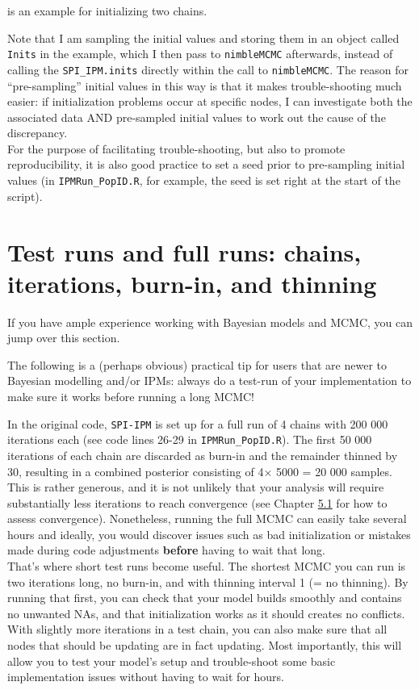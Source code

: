 \documentclass[
]{book}
\begin{document}
is an example for initializing two chains.

Note that I am sampling the initial values and storing them in an object called
\texttt{Inits} in the example, which I then pass to \texttt{nimbleMCMC} afterwards, instead of
calling the \texttt{SPI\_IPM.inits} directly within the call to \texttt{nimbleMCMC}. The reason
for ``pre-sampling'' initial values in this way is that it makes trouble-shooting
much easier: if initialization problems occur at specific nodes, I can
investigate both the associated data AND pre-sampled initial values to work out
the cause of the discrepancy.\\
For the purpose of facilitating trouble-shooting, but also to promote reproducibility,
it is also good practice to set a seed prior to pre-sampling initial values
(in \texttt{IPMRun\_PopID.R}, for example, the seed is set right at the start of the
script).

\hypertarget{test-runs-and-full-runs-chains-iterations-burn-in-and-thinning}{%
\section{Test runs and full runs: chains, iterations, burn-in, and thinning}\label{test-runs-and-full-runs-chains-iterations-burn-in-and-thinning}}

If you have ample experience working with Bayesian models and MCMC, you can jump
over this section.

The following is a (perhaps obvious) practical tip for users that are newer to
Bayesian modelling and/or IPMs: always do a test-run of your implementation to
make sure it works before running a long MCMC!

In the original code, \texttt{SPI-IPM} is set up for a full run of 4 chains with
200 000 iterations each (see code lines 26-29 in \texttt{IPMRun\_PopID.R}). The first
50 000 iterations of each chain are discarded as burn-in and the remainder
thinned by 30, resulting in a combined posterior consisting of 4\(\times\) 5000 = 20 000
samples. This is rather generous, and it is not unlikely that your analysis will
require substantially less iterations to reach convergence (see Chapter
\protect\hyperlink{ux5cux23ux5cux2520Assessingux5cux2520chainux5cux2520convergence}{5.1} for how to assess convergence).
Nonetheless, running the full MCMC can easily take several hours and ideally,
you would discover issues such as bad initialization or mistakes made during
code adjustments \textbf{before} having to wait that long.\\
That's where short test runs become useful. The shortest MCMC you can run is
two iterations long, no burn-in, and with thinning interval 1 (= no thinning).
By running that first, you can check that your model builds smoothly and contains
no unwanted NAs, and that initialization works as it should creates no conflicts.
With slightly more iterations in a test chain, you can also make sure that all
nodes that should be updating are in fact updating. Most importantly, this will
allow you to test your model's setup and trouble-shoot some basic implementation
issues without having to wait for hours.
\end{document}
